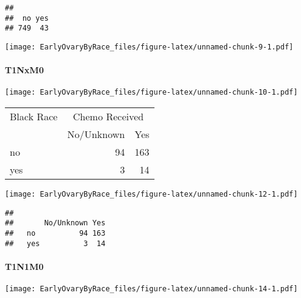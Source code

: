 \documentclass[
]{article}
\newenvironment{Shaded}{\begin{snugshade}}{\end{snugshade}}
\newcommand{\KeywordTok}[1]{\textcolor[rgb]{0.13,0.29,0.53}{\textbf{#1}}}
\newcommand{\NormalTok}[1]{#1}
\newcommand{\OperatorTok}[1]{\textcolor[rgb]{0.81,0.36,0.00}{\textbf{#1}}}
\begin{document}
\begin{Shaded}
\end{Shaded}

\begin{verbatim}
## 
##  no yes 
## 749  43
\end{verbatim}

\texttt{[image: EarlyOvaryByRace\_files/figure-latex/unnamed-chunk-9-1.pdf]}

\hypertarget{t1nxm0}{%
\paragraph{T1NxM0}\label{t1nxm0}}

\texttt{[image: EarlyOvaryByRace\_files/figure-latex/unnamed-chunk-10-1.pdf]}

\begin{tabular}[t]{l|r|r}
\hline
\multicolumn{1}{c|}{Black Race} & \multicolumn{2}{c}{Chemo Received} \\
\cline{1-1} \cline{2-3}
  & No/Unknown & Yes\\
\hline
no & 94 & 163\\
\hline
yes & 3 & 14\\
\hline
\end{tabular}

\texttt{[image: EarlyOvaryByRace\_files/figure-latex/unnamed-chunk-12-1.pdf]}

\begin{Shaded}
\end{Shaded}

\begin{verbatim}
##      
##       No/Unknown Yes
##   no          94 163
##   yes          3  14
\end{verbatim}

\hypertarget{t1n1m0}{%
\paragraph{T1N1M0}\label{t1n1m0}}

\texttt{[image: EarlyOvaryByRace\_files/figure-latex/unnamed-chunk-14-1.pdf]}
\end{document}
